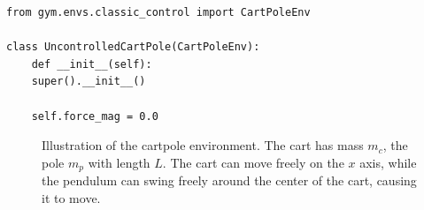 		\begin{lstlisting}[caption={Modification of Gym's cartpole environment to get an uncontrolled cartpole.}, label=lst:uncontrolledCartPole]
from gym.envs.classic_control import CartPoleEnv

class UncontrolledCartPole(CartPoleEnv):
	def __init__(self):
	super().__init__()

	self.force_mag = 0.0
		\end{lstlisting}

		\begin{figure}
			\centering
			\tikzCartpole
			\caption{Illustration of the cartpole environment. The cart has mass \(m_c\), the pole \(m_p\) with length \(L\). The cart can move freely on the \(x\) axis, while the pendulum can swing freely around the center of the cart, causing it to move.}
			\label{fig:envCartpoleGymSketch}
		\end{figure}

